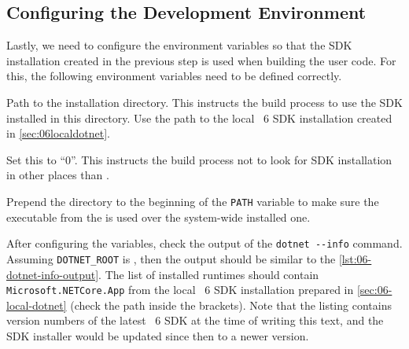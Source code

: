 \subsection{Configuring the Development Environment}\label{sec:06-env-vars}

Lastly, we need to configure the environment variables so that the \dotnet{} SDK installation
created in the previous step is used when building the user code. For this, the following
environment variables need to be defined correctly.

\begin{description}

         Path to the \dotnet{} installation directory. This instructs
the build process to use the SDK installed in this directory. Use the path to the local \dotnet{}~6
SDK installation created in \autoref{sec:06localdotnet}.

         Set this to ``0''. This instructs the build
process not to look for SDK installation in other places than .

         Prepend the  directory to the beginning of the
\texttt{PATH} variable to make sure the  executable from the 
is used over the system-wide installed one.
\end{description}

After configuring the variables, check the output of the \verb|dotnet --info| command. Assuming
\texttt{DOTNET_ROOT} is , then the output should be similar to the
\autoref{lst:06-dotnet-info-output}. The list of installed \dotnet{} runtimes should contain
\texttt{Microsoft.NETCore.App} from the local \dotnet{}~6 SDK installation prepared in
\autoref{sec:06-local-dotnet} (check the path inside the brackets). Note that the listing contains
version numbers of the latest \dotnet{}~6 SDK at the time of writing this text, and the SDK
installer would be updated since then to a newer version.

